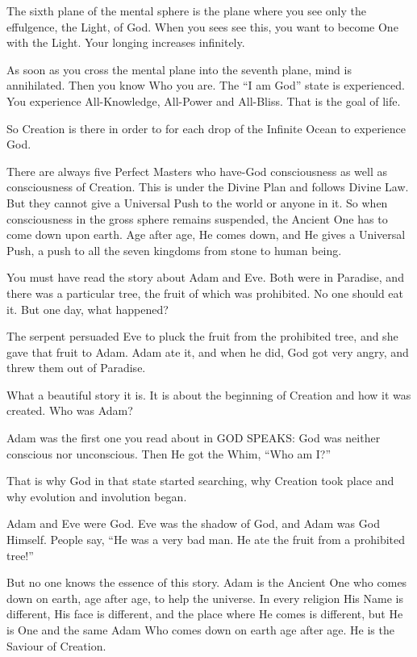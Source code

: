 The sixth plane of the mental sphere is the plane where you see only the effulgence, the Light, of God. When you sees see this, you want to become One with the Light. Your longing increases infinitely.

As soon as you cross the mental plane into the seventh plane, mind is annihilated. Then you know Who you are. The ``I am God'' state is experienced. You experience All-Knowledge, All-Power and All-Bliss. That is the goal of life.

So Creation is there in order to for each drop of the Infinite Ocean to experience God.

There are always five Perfect Masters who have-God consciousness as well as consciousness of Creation. This is under the Divine Plan and follows Divine Law. But they cannot give a Universal Push to the world or anyone in it. So when consciousness in the gross sphere remains suspended, the Ancient One has to come down upon earth. Age after age, He comes down, and He gives a Universal Push, a push to all the seven kingdoms from stone to human being.

You must have read the story about Adam and Eve. Both were in Paradise, and there was a particular tree, the fruit of which was prohibited. No one should eat it. But one day, what happened?

The serpent persuaded Eve to pluck the fruit from the prohibited tree, and she gave that fruit to Adam. Adam ate it, and when he did, God got very angry, and threw them out of Paradise.

What a beautiful story it is. It is about the beginning of Creation and how it was created. Who was Adam?

Adam was the first one you read about in GOD SPEAKS: God was neither conscious nor unconscious. Then He got the Whim, ``Who am I?''

That is why God in that state started searching, why Creation took place and why evolution and involution began.

Adam and Eve were God. Eve was the shadow of God, and Adam was God Himself. People say, ``He was a very bad man. He ate the fruit from a prohibited tree!''

But no one knows the essence of this story. Adam is the Ancient One who comes down on earth, age after age, to help the universe. In every religion His Name is different, His face is different, and the place where He comes is different, but He is One and the same Adam Who comes down on earth age after age. He is the Saviour of Creation.

